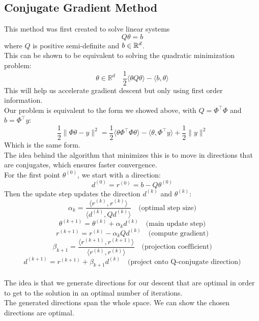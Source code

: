 \documentclass[12pt]{article}
\begin{document}
\newpage

\subsection*{Conjugate Gradient Method}

This method was first created to solve linear systems
\[ Q\theta = b \]
where $Q$ is positive semi-definite and $b \in \mathbb{R}^d$. \\

This can be shown to be equivalent to solving
the quadratic minimization problem:
\[ \theta \in \mathbb{R}^d 
\quad \frac{1}{2} \langle \theta 
Q \theta \rangle - \langle b, \theta \rangle \]
This will help us accelerate gradient descent
but only using first order information. \\

Our problem is equivalent to the form
we showed above, with $Q = \Phi^\top \Phi$ and 
$b = \Phi^\top y$:
\[ \frac{1}{2} \|\Phi \theta - y\|^2 
= \frac{1}{2} \langle \theta 
\Phi^\top \Phi \theta \rangle 
- \langle \theta, \Phi^\top y 
\rangle + \frac{1}{2} \|y\|^2 \]
Which is the same form. \\

The idea behind the algorithm that minimizes
this is to move in directions that are conjugates,
which ensures faster convergence. \\

For the first point $\theta^{(0)}$,
we start with a direction:
\[ d^{(0)} = r^{(0)} = b - Q \theta^{(0)}\]
Then the update step
updates the direction $d^{(k)}$ 
and $\theta^{(k)}$:
\[ \alpha_k = \frac{\langle r^{(k)}, r^{(k)} 
\rangle}{\langle d^{(k)}, Q d^{(k)} \rangle} 
\quad \text{(optimal step size)}\]
\[ \theta^{(k+1)} = \theta^{(k)} + \alpha_k 
d^{(k)} \quad \text{(main update step)} \]
\[ r^{(k+1)} = r^{(k)} - \alpha_k Q d^{(k)} 
\quad \text{(compute gradient)} \]
\[ \beta_{k+1} = \frac{\langle r^{(k+1)}, 
r^{(k+1)} \rangle}{\langle r^{(k)}, r^{(k)} 
\rangle} \quad \text{(projection coefficient)} \]
\[ d^{(k+1)} = r^{(k+1)} + \beta_{k+1} 
d^{(k)} \quad \text{(project onto Q-conjugate 
direction)} \] \\
The idea is that we generate directions for our
descent that are optimal in order to get to the solution
in an optimal number of iterations. \\

The generated directions span the whole space.
We can show the chosen directions are optimal. \\
\end{document}
